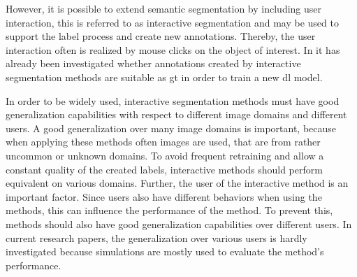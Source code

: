 However, it is possible to extend semantic segmentation by including user interaction, this is referred to as interactive segmentation and may be used to support the label process and create new annotations. 
Thereby, the user interaction often is realized by mouse clicks on the object of interest.
In \cite{Man18-DEXTR} it has already been investigated whether annotations created by interactive segmentation methods are suitable as \gls{gt} in order to train a new \gls{dl} model.

In order to be widely used, interactive segmentation methods must have good generalization capabilities with respect to different image domains and different users.
A good generalization over many image domains is important, because when applying these methods often images are used, that are from rather uncommon or unknown domains.
To avoid frequent retraining and allow a constant quality of the created labels, interactive methods should perform equivalent on various domains.
Further, the user of the interactive method is an important factor.
Since users also have different behaviors when using the methods, this can influence the performance of the method.
To prevent this, methods should also have good generalization capabilities over different users.
In current research papers, the generalization over various users is hardly investigated because simulations are mostly used to evaluate the method's performance.

